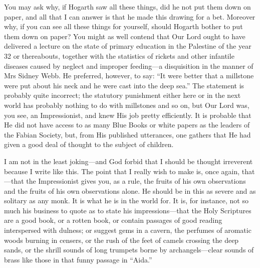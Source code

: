 You may ask why, if Hogarth saw all these things, did he not put them
down on paper, and all that I can answer is that he made this drawing
for a bet. Moreover why, if you can see all these things for yourself,
should Hogarth bother to put them down on paper? You might as well
contend that Our Lord ought to have delivered a lecture on the state of
primary education in the Palestine of the year 32 or thereabouts,
together with the statistics of rickets and other infantile diseases
caused by neglect and improper feeding---a disquisition in the manner of
Mrs Sidney Webb. He preferred, however, to say: ``It were better that a
millstone were put about his neck and he were cast into the deep sea.''
The statement is probably quite incorrect; the statutory punishment
either here or in the next world has probably nothing to do with
millstones and so on, but Our Lord was, you see, an Impressionist, and
knew His job pretty efficiently. It is probable that He did not have
access to as many Blue Books or white papers as the leaders of the
Fabian Society, but, from His published utterances, one gathers that He
had given a good deal of thought to the subject of children.

I am not in the least joking---and God forbid that I should be thought
irreverent because I write like this. The point that I really wish to
make is, once again, that---that the Impressionist gives you, as a rule,
the fruits of his own observations and the fruits of his own
observations alone. He should be in this as severe and as solitary as
any monk. It is what he is in the world for. It is, for instance, not so
much his business to quote as to state his impressions---that the Holy
Scriptures are a good book, or a rotten book, or contain passages of
good reading interspersed with dulness; or suggest gems in a cavern, the
perfumes of aromatic woods burning in censers, or the rush of the feet
of camels crossing the deep sands, or the shrill sounds of long trumpets
borne by archangels---clear sounds of brass like those in that funny
passage in ``Aida.''

